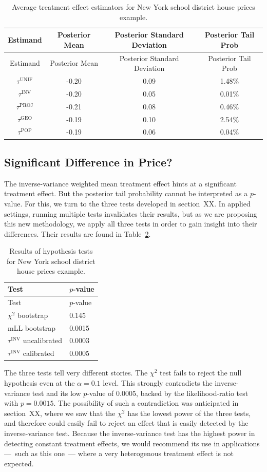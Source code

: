 \documentclass[letter]{article}
\newcommand{\unifavg}{\tau^{\mathrm{UNIF}}}
\newcommand{\invvar}{\tau^{\mathrm{INV}}}
\newcommand{\tauproj}{\tau^{\mathrm{PROJ}}}
\newcommand{\taugeo}{\tau^{\mathrm{GEO}}}
\newcommand{\taupop}{\tau^{\mathrm{POP}}}
\begin{document}
    	\begin{longtable}[]{@{}cccc@{}}
\caption{Average treatment effect estimators for New York school district house prices example. \label{table:NYC_ate}}\tabularnewline
\toprule
Estimand & Posterior Mean & Posterior Standard Deviation & Posterior Tail Prob\tabularnewline
\midrule
\endfirsthead
\toprule
Estimand & Posterior Mean & Posterior Standard Deviation & Posterior Tail Prob\tabularnewline
\midrule
\endhead
\(\unifavg\) & -0.20 & 0.09 & 1.48\%\tabularnewline
\(\invvar\) & -0.20 & 0.05 & 0.01\%\tabularnewline
\(\tauproj\) & -0.21 & 0.08 & 0.46\%\tabularnewline
\(\taugeo\) & -0.19 & 0.10 & 2.54\%\tabularnewline
\(\taupop\) & -0.19 & 0.06 & 0.04\%\tabularnewline
\bottomrule
\end{longtable}
    


    	\subsection{Significant Difference in Price?}\label{significant-difference-in-price}

The inverse-variance weighted mean treatment effect hints at a significant treatment effect.
But the posterior tail probability cannot be interpreted as a \(p\)-value.
For this, we turn to the three tests developed in section~XX.
In applied settings, running multiple tests invalidates their results,
but as we are proposing this new methodology,
we apply all three tests in order to gain insight into their differences.
Their results are found in Table~\ref{table:NYC_tests}.
    


    	\begin{longtable}[]{@{}ll@{}}
\caption{Results of hypothesis tests for New York school district house prices example. \label{table:NYC_tests}}\tabularnewline
\toprule
Test & \(p\)-value\tabularnewline
\midrule
\endfirsthead
\toprule
Test & \(p\)-value\tabularnewline
\midrule
\endhead
\(\chi^2\) bootstrap & 0.145\tabularnewline
mLL bootstrap & 0.0015\tabularnewline
\(\invvar\) uncalibrated & 0.0003\tabularnewline
\(\invvar\) calibrated & 0.0005\tabularnewline
\bottomrule
\end{longtable}
    


    	The three tests tell very different stories.
The \(\chi^2\) test fails to reject the null hypothesis even at the \(\alpha=0.1\) level.
This strongly contradicts the inverse-variance test and its low \(p\)-value of \(0.0005\),
backed by the likelihood-ratio test with \(p=0.0015\).
The possibility of such a contradiction was anticipated in section~XX, where we saw that the \(\chi^2\) has the lowest power of the three tests, and therefore could easily fail to reject an effect that is easily detected by the inverse-variance test.
Because the inverse-variance test has the highest power in detecting constant treatment effects, we would recommend its use in applications ---~such as this one~--- where a very heterogenous treatment effect is not expected.
    
\end{document}
